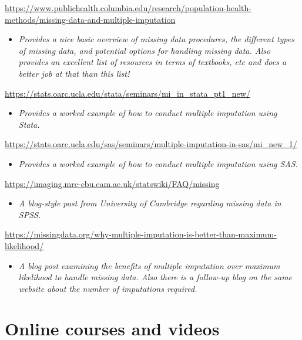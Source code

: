 \documentclass[
]{book}
\providecommand{\tightlist}{%
  \setlength{\itemsep}{0pt}\setlength{\parskip}{0pt}}
\begin{document}
\url{https://www.publichealth.columbia.edu/research/population-health-methods/missing-data-and-multiple-imputation}

\begin{itemize}
\tightlist
\item
  \emph{Provides a nice basic overview of missing data procedures, the different types of missing data, and potential options for handling missing data. Also provides an excellent list of resources in terms of textbooks, etc and does a better job at that than this list! }
\end{itemize}

\url{https://stats.oarc.ucla.edu/stata/seminars/mi_in_stata_pt1_new/}

\begin{itemize}
\tightlist
\item
  \emph{Provides a worked example of how to conduct multiple imputation using Stata. }
\end{itemize}

\url{https://stats.oarc.ucla.edu/sas/seminars/multiple-imputation-in-sas/mi_new_1/}

\begin{itemize}
\tightlist
\item
  \emph{Provides a worked example of how to conduct multiple imputation using SAS.}
\end{itemize}

\url{https://imaging.mrc-cbu.cam.ac.uk/statswiki/FAQ/missing}

\begin{itemize}
\tightlist
\item
  \emph{A blog-style post from University of Cambridge regarding missing data in SPSS.}
\end{itemize}

\url{https://missingdata.org/why-multiple-imputation-is-better-than-maximum-likelihood/}

\begin{itemize}
\tightlist
\item
  \emph{A blog post examining the benefits of multiple imputation over maximum likelihood to handle missing data. Also there is a follow-up blog on the same website about the number of imputations required. }
\end{itemize}

\section{Online courses and videos}\label{online-courses-and-videos-4}
\end{document}

